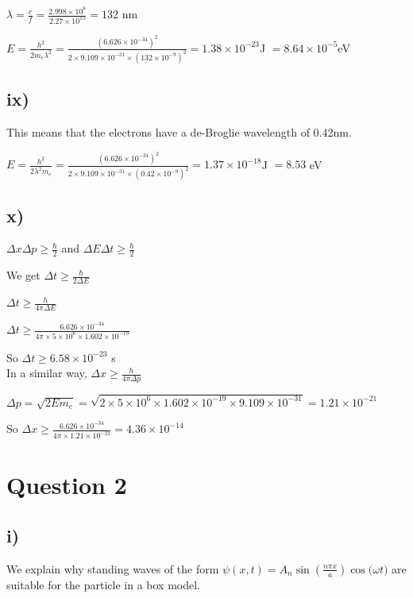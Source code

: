 \documentclass{article}
\begin{document}
$\lambda = \frac{c}{f} = \frac{2.998 \times 10^{8}}{2.27 \times 10^{15}} = 132$ nm

$E = \frac{h^2}{2m_e \lambda^2} = \frac{(6.626 \times 10 ^{-34})^2}{2 \times 9.109 \times 10^{-31}\times (132\times10^{-9})^2} = 1.38 \times 10^{-23}$J $ = 8.64 \times 10^{-5} $eV

\subsection*{ix)}

This means that the electrons have a de-Broglie wavelength of 0.42nm.

$E = \frac{h^2}{2\lambda^2m_e} = \frac{(6.626 \times 10 ^{-34})^2}{2 \times 9.109 \times 10^{-31}\times (0.42\times10^{-9})^2} = 1.37 \times 10 ^{-18}$J $= 8.53$ eV


\subsection*{x)}

$\Delta x \Delta p \geq \frac{\hbar}{2}$ and $\Delta E \Delta t \geq \frac{\hbar}{2}$

We get $\Delta t \geq \frac{\hbar}{2\Delta E}$

$\Delta t \geq \frac{h}{4 \pi \Delta E}$

$\Delta t \geq \frac{6.626 \times 10^{-34}}{4\pi \times 5 \times 10^6 \times 1.602 \times 10^{-19}}$

So $\Delta t \geq 6.58 \times 10^{-23}$ s
\\

In a similar way, $\Delta x \geq \frac{h}{4 \pi \Delta p}$

$\Delta p = \sqrt{2 E m_e} = \sqrt{2 \times 5 \times 10^6 \times 1.602 \times 10^{-19} \times 9.109 \times 10^{-31}} = 1.21 \times 10^{-21}$

So $\Delta x \geq \frac{6.626\times10^{-34}}{4 \pi \times 1.21 \times 10^{-21}} = 4.36 \times 10^{-14}$

\section{Question 2}

\subsection*{i)}

We explain why standing waves of the form $\psi(x,t) = A_n\sin(\frac{n\pi x}{a})\cos{(\omega t})$ are suitable for the particle in a box model.
\\
\end{document}
